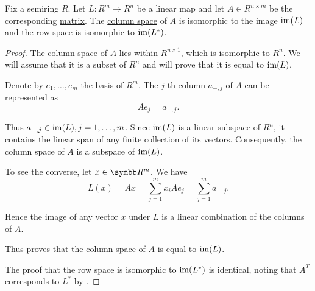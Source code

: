 \begin{proposition}\label{thm:column_and_row_spaces_are_images}
  Fix a semiring \( R \). Let \( L: R^m \to R^n \) be a linear map and let \( A \in R^{n \times m} \) be the corresponding \hyperref[thm:finite_dimensional_operators_are_isomorphic_to_matrices]{matrix}. The \hyperref[def:matrix_column_and_row_space]{column space} of \( A \) is isomorphic to the image \( \operatorname{im}(L) \) and the row space is isomorphic to \( \operatorname{im}(L^*) \).
\end{proposition}
\begin{proof}
  The column space of \( A \) lies within \( R^{n \times 1} \), which is isomorphic to \( R^n \). We will assume that it is a subset of \( R^n \) and will prove that it is equal to \( \operatorname{im}(L) \).

  Denote by \( e_1, \ldots, e_m \) the basis of \( R^m \). The \( j \)-th column \( a_{-,j} \) of \( A \) can be represented as
  \begin{equation*}
    A e_j = a_{-,j}.
  \end{equation*}

  Thus \( a_{-,j} \in \operatorname{im}(L), j = 1, \ldots, m \). Since \( \operatorname{im}(L) \) is a linear subspace of \( R^n \), it contains the linear span of any finite collection of its vectors. Consequently, the column space of \( A \) is a subspace of \( \operatorname{im}(L) \).

  To see the converse, let \( x \in \BR^m \). We have
  \begin{equation*}
    L(x) = Ax = \sum_{j=1}^m x_i A e_j = \sum_{j=1}^m a_{-,j}.
  \end{equation*}

  Hence the image of any vector \( x \) under \( L \) is a linear combination of the columns of \( A \).

  Thus proves that the column space of \( A \) is equal to \( \operatorname{im}(L) \).

  The proof that the row space is isomorphic to \( \operatorname{im}(L^*) \) is identical, noting that \( A^T \) corresponds to \( L^* \) by .
\end{proof}
